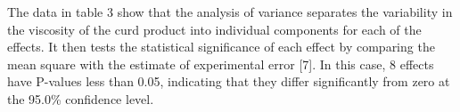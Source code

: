 
The data in table 3 show that the analysis of variance separates the
variability in the viscosity of the curd product into individual
components for each of the effects. It then tests the statistical
significance of each effect by comparing the mean square with the
estimate of experimental error {[}7{]}. In this case, 8 effects have
P-values less than 0.05, indicating that they differ significantly from
zero at the 95.0\% confidence level.

